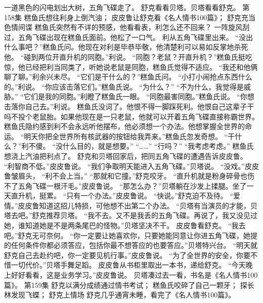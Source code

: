 \documentclass[a4paper,12pt,UTF8,twoside]{ctexbook}
\begin{document}
        一道黑色的闪电划出大树，五角飞碟走了。 
        舒克看看贝塔。贝塔看看舒克。   第158集 
        糕鱼氏想往利身上倒汽油； 
        皮皮鲁让舒克看《名人情书100篇》； 
        舒克充当色情间谍 
        糕鱼氏突然有不详的预感，他看看表，利怎么还不回来？ 
        一阵旋风刮过，五角飞碟出现在糕鱼氏面前。他松了一口气。 
        利从五角飞碟里出来。 
        “没出什么事吧？”糕鱼氏问。他现在对利是毕恭毕敬，他清楚利可以易如反掌地杀死他。 
        “碰到两位开直升机的同胞。”利说。 
        “同胞？老鼠？开直升机？”糕鱼氏挺吃惊，他已经把利当同类了，听她说老鼠是同胞，糕鱼氏觉得不适应。 
        “我还和他俩聊了聊。”利余兴未尽。 
        “它们是干什么的？”糕鱼氏问。 
        “小打小闹抢点东西什么的。”利说。 
        “你应该击落它们。”糕鱼氏说。 
        “为什么？” 
        “不为什么，我觉得是威胁。” 
        “它们是我的同胞。”利瞪了糕鱼氏一眼。 
        “同胞最害同胞。”糕鱼氏说。 
        “你想击落你自己去。”利说。 
        糕鱼氏没词了。他恨不得一脚踩死利。他恨自己这辈子干吗不投个老鼠胎。如果他现在是一只老鼠，他就可以开着五角飞碟直接称霸世界。 
        糕鱼氏隐约感到利不会永远听他摆布，他必须想一个办法。他想掌握全世界的命运。 
        “明天你把全世界所有核武器的按钮给我弄来。”糕鱼氏忽发奇想。 
        “干什么？”利不傻。 
        “没什么目的，就是想要。” 
        “……” 
        “行吗？” 
        “我考虑考虑。” 
        糕鱼氏想浇上汽油把利点了。 
        舒克和贝塔回家后，把同五角飞碟的遭遇告诉皮皮鲁。 
        “利智商不低。”皮皮鲁说。 
        “我们争取明天能进入五角飞碟。”贝塔说。 
        “没戏。”皮皮鲁皱眉头，  “利不会上当。” 
        “那就和它撞。”舒克咬牙。 
        “直升机就是粉身碎骨也伤不了五角飞碟一根汗毛。”皮皮鲁说。 
        “那怎么办？”贝塔躺在沙发上揉腿。坐了一天直升机，挺累。 
        “只有一个办法。”皮皮鲁说。 
        “快说。”舒克迫不及待。 
        “爱情。”皮皮鲁知道这招儿特损，可他想不出第二个办法。 
        “贝塔有当演员的才能，贝塔去吧。”舒克推荐贝塔。 
        “我不去。又不是我丢的五角飞碟。再说了，我又没见过她，谁知道她是不是两条尾巴的怪物。”贝塔坚决不干。 
        皮皮鲁看舒克。 
        “我去吧。”舒克无可奈何。 
        “你一定要让她喜欢你，只要她能同意让你进五角飞碟，她提的任何条件你都必须答应，包括你最不想答应的也要答应。”贝塔特兴台。 
        “明天就舒克自己去赴约吧，你一定要见机行事。”皮皮鲁说。 
        “为了全世界的安全，你要不惜一切代价。”贝塔手舞足蹈。 
        皮皮鲁从书柜里取出一本书，递给舒克。 
        “今天晚上好好看看，这是业务学习。”皮皮鲁说。 
        贝塔凑过去一看，书名是《名人情书100篇》。   第159集 
        舒克以满分成绩通过情书考试； 
        糕鱼氏咬碎了自己一颗牙； 
        探长林发现飞蝶； 
        舒克上情场   
        舒克几乎通宵未睡，看完了《名人情书100篇》。 
\end{document}
